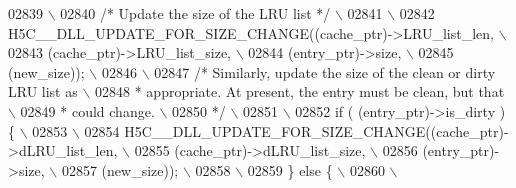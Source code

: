 \begin{DoxyCode}
02839 \textcolor{preprocessor}{                                                                          \(\backslash\)}
02840 \textcolor{preprocessor}{    }\textcolor{comment}{/* Update the size of the LRU list */}\textcolor{preprocessor}{                             \(\backslash\)}
02841 \textcolor{preprocessor}{                                                                          \(\backslash\)}
02842 \textcolor{preprocessor}{    H5C\_\_DLL\_UPDATE\_FOR\_SIZE\_CHANGE((cache\_ptr)->LRU\_list\_len,        \(\backslash\)}
02843 \textcolor{preprocessor}{                            (cache\_ptr)->LRU\_list\_size,       \(\backslash\)}
02844 \textcolor{preprocessor}{                            (entry\_ptr)->size,                \(\backslash\)}
02845 \textcolor{preprocessor}{                    (new\_size));                      \(\backslash\)}
02846 \textcolor{preprocessor}{                                                                          \(\backslash\)}
02847 \textcolor{preprocessor}{        }\textcolor{comment}{/* Similarly, update the size of the clean or dirty LRU list as   \(\backslash\)}
02848 \textcolor{comment}{     * appropriate.  At present, the entry must be clean, but that    \(\backslash\)}
02849 \textcolor{comment}{     * could change.                                                  \(\backslash\)}
02850 \textcolor{comment}{         */}\textcolor{preprocessor}{                                                               \(\backslash\)}
02851 \textcolor{preprocessor}{                                                                          \(\backslash\)}
02852 \textcolor{preprocessor}{        if ( (entry\_ptr)->is\_dirty ) \{                                    \(\backslash\)}
02853 \textcolor{preprocessor}{                                                                          \(\backslash\)}
02854 \textcolor{preprocessor}{        H5C\_\_DLL\_UPDATE\_FOR\_SIZE\_CHANGE((cache\_ptr)->dLRU\_list\_len,   \(\backslash\)}
02855 \textcolor{preprocessor}{                                (cache\_ptr)->dLRU\_list\_size,  \(\backslash\)}
02856 \textcolor{preprocessor}{                                (entry\_ptr)->size,            \(\backslash\)}
02857 \textcolor{preprocessor}{                        (new\_size));                  \(\backslash\)}
02858 \textcolor{preprocessor}{                                                                          \(\backslash\)}
02859 \textcolor{preprocessor}{        \} else \{                                                          \(\backslash\)}
02860 \textcolor{preprocessor}{                                                                          \(\backslash\)}

\end{DoxyCode}
